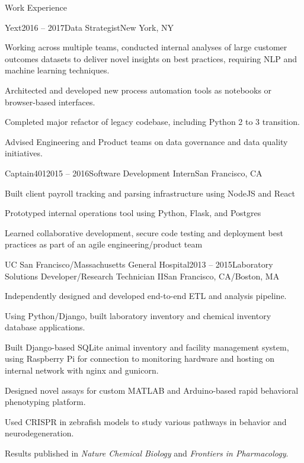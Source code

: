 \documentclass{resume} %
\begin{document}




\begin{rSection}{Work Experience}
\vspace{0.3em}
\begin{rSubsection}{Yext}{2016 -- 2017}{Data Strategist}{New York, NY}
\item Working across multiple teams, conducted internal analyses of large customer outcomes datasets to deliver novel insights on best practices, requiring NLP and machine learning techniques.
\item Architected and developed new process automation tools as notebooks or browser-based interfaces.
\item Completed major refactor of legacy codebase, including Python 2 to 3 transition.
\item Advised Engineering and Product teams on data governance and data quality initiatives.

\end{rSubsection}

\begin{rSubsection}{Captain401}{2015 -- 2016}{Software Development Intern}{San Francisco, CA}
\item Built client payroll tracking and parsing infrastructure using NodeJS and React
\item Prototyped internal operations tool using Python, Flask, and Postgres
\item Learned collaborative development, secure code testing and deployment best practices as part of an agile engineering/product team

\end{rSubsection}


\begin{rSubsection}{UC San Francisco/Massachusetts General Hospital}{2013 -- 2015}{Laboratory Solutions Developer/Research Technician II}{San Francisco, CA/Boston, MA}
\item Independently designed and developed end-to-end ETL and analysis pipeline.
\item Using Python/Django, built laboratory inventory and chemical inventory database applications.
\item Built Django-based SQLite animal inventory and facility management system, using Raspberry Pi for connection to monitoring hardware and hosting on internal network with nginx and gunicorn.
\item Designed novel assays for custom MATLAB and Arduino-based rapid behavioral phenotyping platform.
\item Used CRISPR in zebrafish models to study various pathways in behavior and neurodegeneration.
\item Results published in {\em Nature Chemical Biology} and {\em Frontiers in Pharmacology}.
\end{rSubsection}


\end{rSection}
\end{document}
